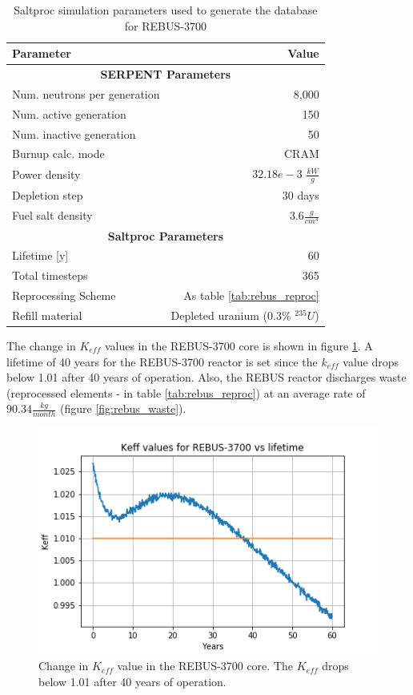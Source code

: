 \begin{table}[h]
	\centering
	\caption{Saltproc simulation parameters used to generate the database for REBUS-3700}
	\begin{tabular}{lr}
		\hline
		\textbf{Parameter} & \textbf{Value}\\
		\hline
		\multicolumn{2}{c}{\textbf{SERPENT Parameters}} \\
		\hline
		Num. neutrons per generation & 8,000 \\
		Num. active generation & 150\\
		Num. inactive generation & 50 \\
		Burnup calc. mode & CRAM \\
		Power density & $32.18e-3$ $\frac{kW}{g}$ \\ 
		Depletion step & 30 days\\
		Fuel salt density & $3.6 \frac{g}{cm^3}$ \\		
		\hline
		\multicolumn{2}{c}{\textbf{Saltproc Parameters}} \\
		\hline
		Lifetime [y]  & 60 \\
		Total timesteps & 365 \\
		Reprocessing Scheme & As table \ref{tab:rebus_reproc}\\
		Refill material & Depleted uranium ($0.3\%$ $^{235}U$) \\
		\hline
	\end{tabular}
	
	\label{tab:saltproc-run-params}
	
\end{table}

The change in $K_{eff}$ values in the REBUS-3700 core is shown in figure \ref{fig:keff}.
A lifetime of 40 years for the REBUS-3700 reactor is set since the $k_{eff}$
value drops below 1.01 after 40 years of operation. Also, the REBUS reactor discharges
waste (reprocessed elements - in table \ref{tab:rebus_reproc}) at an average rate of 
$90.34 \frac{kg}{month}$ (figure \ref{fig:rebus_waste}). 


\begin{figure}[htbp!]
	\begin{center}
		\includegraphics[scale=0.6]{./images/us/keff.png}
	\end{center}
	\caption{Change in $K_{eff}$ value in the REBUS-3700 core. The $K_{eff}$ drops below
		1.01 after 40 years of operation.}
	\label{fig:keff}
\end{figure}

